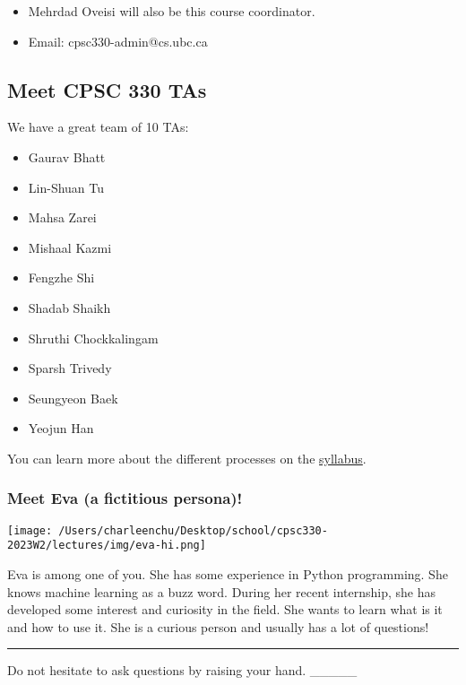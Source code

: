 \documentclass[11pt]{article}
\providecommand{\tightlist}{%
      \setlength{\itemsep}{0pt}\setlength{\parskip}{0pt}}
\begin{document}
\begin{itemize}
\tightlist
\item
  Mehrdad Oveisi will also be this course coordinator.
\item
  Email: cpsc330-admin@cs.ubc.ca
\end{itemize}

    \subsection{Meet CPSC 330 TAs}\label{meet-cpsc-330-tas}

We have a great team of 10 TAs:

\begin{itemize}
\tightlist
\item
  Gaurav Bhatt
\item
  Lin-Shuan Tu
\item
  Mahsa Zarei
\item
  Mishaal Kazmi
\item
  Fengzhe Shi
\item
  Shadab Shaikh
\item
  Shruthi Chockkalingam
\item
  Sparsh Trivedy
\item
  Seungyeon Baek
\item
  Yeojun Han
\end{itemize}

You can learn more about the different processes on the
\href{https://github.com/UBC-CS/cpsc330-2023W2/blob/main/syllabus.md}{syllabus}.

    \subsubsection{Meet Eva (a fictitious
persona)!}\label{meet-eva-a-fictitious-persona}

\texttt{[image: /Users/charleenchu/Desktop/school/cpsc330-2023W2/lectures/img/eva-hi.png]}

Eva is among one of you. She has some experience in Python programming.
She knows machine learning as a buzz word. During her recent internship,
she has developed some interest and curiosity in the field. She wants to
learn what is it and how to use it. She is a curious person and usually
has a lot of questions!

    \begin{center}\rule{0.5\linewidth}{0.5pt}\end{center}

Do not hesitate to ask questions by raising your hand. \_\_\_\_\_
\end{document}
